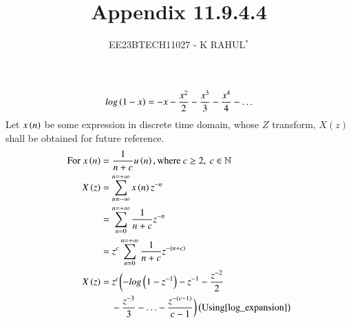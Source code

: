 \documentclass[journal,12pt,twocolumn]{IEEEtran}
\theoremstyle{remark}
\begin{document}

\vspace{3cm}
\title{Appendix 11.9.4.4}
\author{EE23BTECH11027 - K RAHUL$^{*}$%
}
\maketitle
\newpage
\bigskip
\renewcommand{\thefigure}{\theenumi}
\renewcommand{\thetable}{\theenumi}
\begin{align}
        log\left(1-x\right) = -x - \frac{x^2}{2} - \frac{x^3}{3}-\frac{x^4}{4}- \ldots \label{log_expansion}
\end{align}
Let $x\left(n\right)$ be some expression in discrete time domain, whose $Z$ transform, $X(z)$ shall be obtained for future reference.\\
\begin{align}
	\notag\text{For } x\left(n\right) &= \frac{1}{n+c} u\left(n\right),\text{where} \: c \geq 2,\: c \in \mathbb{N}\\
    X\left(z\right) &= \sum_{n= -\infty}^{n= +\infty} x\left(n\right)z^{-n}\\
    &=\sum_{n = 0}^{n = +\infty} \frac{1}{n+c}z^{-n}\\
    &= z^c\sum_{n = 0}^{n = +\infty} \frac{1}{n+c}z^{-\left(n+c\right)} \\
    X\left(z\right)&= z^c \biggl(-log\left(1-z^{-1}\right)- z^{-1}-\frac{z^{-2}}{2}\notag \\& \;\;\;\;-\frac{z^{-3}}{3} - \ldots -\frac{z^{-(c-1)}}{c-1} \biggr) \left(\text{Using} \eqref{log_expansion}\right) \label{11027_eq1}
\end{align} 
\end{document}
